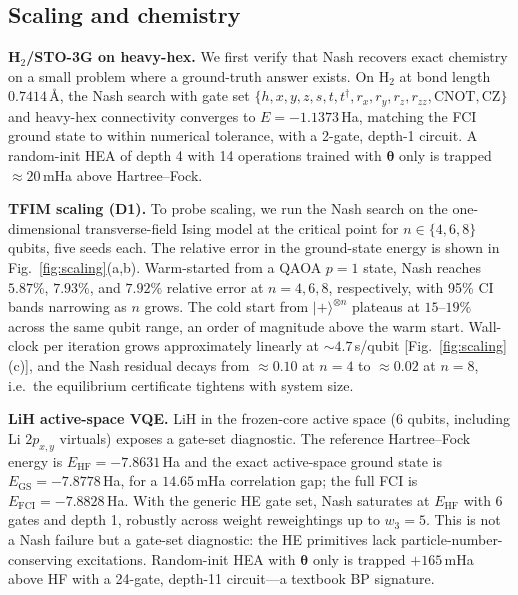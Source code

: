 \documentclass[prl,twocolumn,aps,superscriptaddress,showkeys,floatfix,nofootinbib]{revtex4-2}
\begin{document}
\subsection{Scaling and chemistry}

\textbf{H$_2$/STO-3G on heavy-hex.} We first verify that Nash recovers exact chemistry on a small problem where a ground-truth answer exists. On H$_2$ at bond length $0.7414$\,\AA, the Nash search with gate set $\{h,x,y,z,s,t,t^\dagger,r_x,r_y,r_z,r_{zz},\text{CNOT},\text{CZ}\}$ and heavy-hex connectivity converges to $E=-1.1373$\,Ha, matching the FCI ground state to within numerical tolerance, with a 2-gate, depth-1 circuit. A random-init HEA of depth 4 with 14 operations trained with $\bm\theta$ only is trapped $\approx 20$\,mHa above Hartree--Fock.

\textbf{TFIM scaling (D1).} To probe scaling, we run the Nash search on the one-dimensional transverse-field Ising model at the critical point for $n\in\{4,6,8\}$ qubits, five seeds each. The relative error in the ground-state energy is shown in Fig.~\ref{fig:scaling}(a,b). Warm-started from a QAOA $p=1$ state, Nash reaches $5.87\%$, $7.93\%$, and $7.92\%$ relative error at $n=4,6,8$, respectively, with 95\% CI bands narrowing as $n$ grows. The cold start from $|+\rangle^{\otimes n}$ plateaus at $15$--$19\%$ across the same qubit range, an order of magnitude above the warm start. Wall-clock per iteration grows approximately linearly at $\sim 4.7$\,s/qubit [Fig.~\ref{fig:scaling}(c)], and the Nash residual decays from $\approx 0.10$ at $n=4$ to $\approx 0.02$ at $n=8$, i.e.\ the equilibrium certificate tightens with system size.

\textbf{LiH active-space VQE.} LiH in the frozen-core active space (6 qubits, including Li $2p_{x,y}$ virtuals) exposes a gate-set diagnostic. The reference Hartree--Fock energy is $E_\text{HF}=-7.8631$\,Ha and the exact active-space ground state is $E_\text{GS}=-7.8778$\,Ha, for a $14.65$\,mHa correlation gap; the full FCI is $E_\text{FCI}=-7.8828$\,Ha. With the generic HE gate set, Nash saturates at $E_\text{HF}$ with 6 gates and depth 1, robustly across weight reweightings up to $w_3=5$. This is not a Nash failure but a gate-set diagnostic: the HE primitives lack particle-number-conserving excitations. Random-init HEA with $\bm\theta$ only is trapped $+165$\,mHa above HF with a 24-gate, depth-11 circuit---a textbook BP signature.
\end{document}
